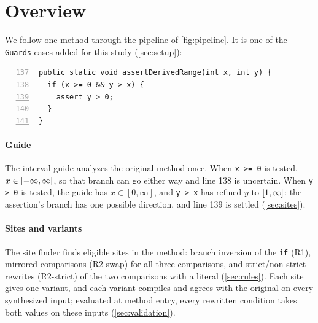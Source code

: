 \section{Overview}
\label{sec:overview}



We follow one method through the pipeline of \cref{fig:pipeline}. It is one of
the \texttt{Guards} cases added for this study (\cref{sec:setup}):

\begin{lstlisting}[numbers=left,firstnumber=137,numberstyle=\tiny]
public static void assertDerivedRange(int x, int y) {
  if (x >= 0 && y > x) {
    assert y > 0;
  }
}
\end{lstlisting}

\paragraph{Guide}
The interval guide analyzes the original method once. When \texttt{x >= 0} is
tested, $x\in[-\infty,\infty]$, so that branch can go either way and line 138
is uncertain. When \texttt{y > 0} is tested, the guide has $x\in[0,\infty]$,
and \texttt{y > x} has refined $y$ to $[1,\infty]$: the assertion's
branch has one possible direction, and line 139 is settled
(\cref{sec:sites}).

\paragraph{Sites and variants}
The site finder finds \OverviewNumSites{} eligible sites in the method: branch
inversion of the \texttt{if} (R1), mirrored comparisons (R2-swap) for all
three comparisons, and strict/non-strict rewrites (R2-strict) of the two
comparisons with a literal (\cref{sec:rules}). Each site gives one variant,
and each variant compiles and agrees with the original on every synthesized
input; evaluated at method entry, every rewritten condition takes both values
on these inputs (\cref{sec:validation}).

\begin{table}[t]
\caption{The worked example: predicted outcome sets of the original and of
each variant (ok, assertion error AE). Bold: differs from the original; the
two bold cells are one distinct inconsistency.}
\label{tab:overview}
\small

\end{table}

